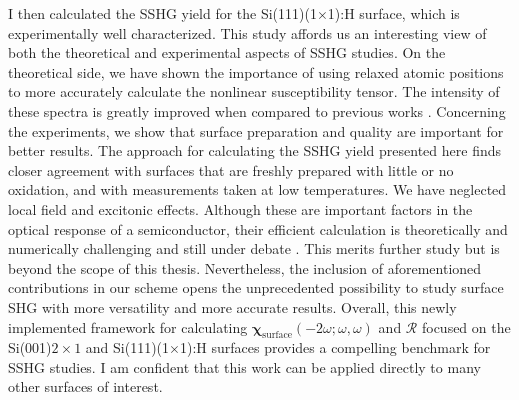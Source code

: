 I then calculated the SSHG yield for the Si(111)(1$\times$1):H surface, which is
experimentally well characterized. This study affords us an interesting view of
both the theoretical and experimental aspects of SSHG studies. On the
theoretical side, we have shown the importance of using relaxed atomic positions
to more accurately calculate the nonlinear susceptibility tensor. The intensity
of these spectra is greatly improved when compared to previous works
\cite{mejiaPRB02}. Concerning the experiments, we show that surface preparation
and quality are important for better results. The approach for calculating the
SSHG yield presented here finds closer agreement with surfaces that are freshly
prepared with little or no oxidation, and with measurements taken at low
temperatures. We have neglected local field and excitonic effects. Although
these are important factors in the optical response of a semiconductor, their
efficient calculation is theoretically and numerically challenging and still
under debate \cite{beyond}. This merits further study but is beyond the scope of
this thesis. Nevertheless, the inclusion of aforementioned contributions in our
scheme opens the unprecedented possibility to study surface SHG with more
versatility and more accurate results. Overall, this newly implemented framework
for calculating $\boldsymbol{\chi}_{\mathrm{surface}}(-2\omega;\omega,\omega)$
and $\mathcal{R}$ focused on the Si(001)$2\times 1$ and Si(111)(1$\times$1):H
surfaces provides a compelling benchmark for SSHG studies. I am confident that
this work can be applied directly to many other surfaces of interest.

\stopcontents[chapters]
